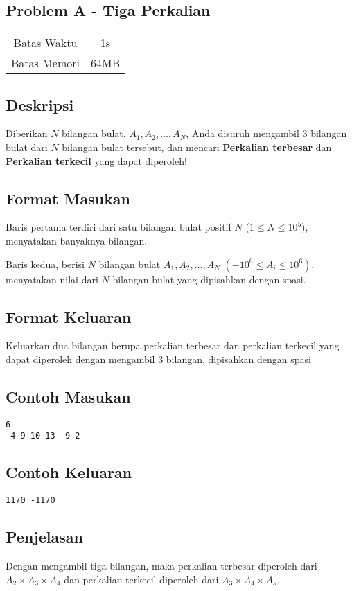 \documentclass{article}
\begin{document}
\begin{center}
    \section*{Problem A - Tiga Perkalian} %
    \begin{tabular}{ | c c | }
        \hline
        Batas Waktu  & 1s \\    %
        Batas Memori & 64MB \\  %
        \hline
    \end{tabular}
\end{center}

\subsection*{Deskripsi}

Diberikan $N$ bilangan bulat, $A_1, A_2, \dots, A_N$, Anda disuruh mengambil 3 bilangan bulat dari $N$ bilangan bulat tersebut, dan mencari \textbf{Perkalian terbesar} dan \textbf{Perkalian terkecil} yang dapat diperoleh!

\subsection*{Format Masukan}

Baris pertama terdiri dari satu bilangan bulat positif $N$ ($1 \leq N \leq 10^5$), menyatakan banyaknya bilangan.

Baris kedua, berisi $N$ bilangan bulat $A_1, A_2, \dots, A_N$ $(-10^6 \leq A_i \leq 10^6)$, menyatakan nilai dari $N$ bilangan bulat yang dipisahkan dengan spasi.

\subsection*{Format Keluaran}

Keluarkan dua bilangan berupa perkalian terbesar dan perkalian terkecil yang dapat diperoleh dengan mengambil 3 bilangan, dipisahkan dengan spasi

\begin{multicols}{2}
\subsection*{Contoh Masukan}
\begin{lstlisting}
6
-4 9 10 13 -9 2 
\end{lstlisting}
\columnbreak
\subsection*{Contoh Keluaran}
\begin{lstlisting}
1170 -1170
\end{lstlisting}
\vfill
\null
\end{multicols}

\subsection*{Penjelasan}

Dengan mengambil tiga bilangan, maka perkalian terbesar diperoleh dari $A_2 \times A_3 \times A_4$ dan perkalian terkecil diperoleh dari $A_3 \times A_4 \times A_5$.

\pagebreak
\end{document}
